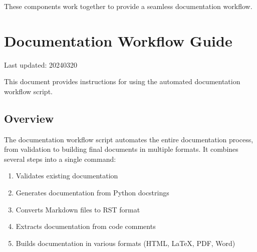 \documentclass[letterpaper,10pt,english]{sphinxmanual}
\begin{document}
\sphinxAtStartPar
These components work together to provide a seamless documentation workflow.

\sphinxstepscope


\section{Documentation Workflow Guide}
\label{\detokenize{documentation_workflow:documentation-workflow-guide}}\label{\detokenize{documentation_workflow::doc}}
\sphinxAtStartPar
Last updated: 2024\sphinxhyphen{}03\sphinxhyphen{}20

\sphinxAtStartPar
This document provides instructions for using the automated documentation workflow script.


\subsection{Overview}
\label{\detokenize{documentation_workflow:overview}}
\sphinxAtStartPar
The documentation workflow script automates the entire documentation process, from validation to building final documents in multiple formats. It combines several steps into a single command:
\begin{enumerate}
%
\item {} 
\sphinxAtStartPar
Validates existing documentation

\item {} 
\sphinxAtStartPar
Generates documentation from Python docstrings

\item {} 
\sphinxAtStartPar
Converts Markdown files to RST format

\item {} 
\sphinxAtStartPar
Extracts documentation from code comments

\item {} 
\sphinxAtStartPar
Builds documentation in various formats (HTML, LaTeX, PDF, Word)

\end{enumerate}
\end{document}

